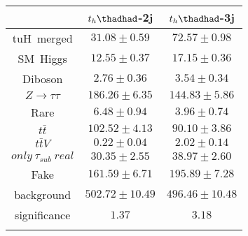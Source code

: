 \centering
\begin{tabular}{|ccc} \toprule\toprule
 & $t_{h}\thadhad$-2j & $t_{h}\thadhad$-3j\\\midrule
tuH~merged & $31.08\pm0.59$ & $72.57\pm0.98$\\
SM~Higgs & $12.55\pm0.37$ & $17.15\pm0.36$\\
Diboson & $2.76\pm0.36$ & $3.54\pm0.34$\\
$Z\to\tau\tau$ & $186.26\pm6.35$ & $144.83\pm5.86$\\
Rare & $6.48\pm0.94$ & $3.96\pm0.74$\\
$t\bar{t}$ & $102.52\pm4.13$ & $90.10\pm3.86$\\
$t\bar{t}V$ & $0.22\pm0.04$ & $2.02\pm0.14$\\
$only~\tau_{sub}~real$ & $30.35\pm2.55$ & $38.97\pm2.60$\\
Fake & $161.59\pm6.71$ & $195.89\pm7.28$\\
background & $502.72\pm10.49$ & $496.46\pm10.48$\\
significance & $1.37$ & $3.18$\\
\bottomrule\bottomrule\\
\end{tabular}

